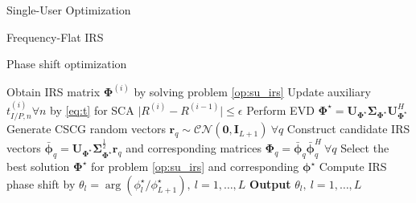 \documentclass{IEEEtran}
\begin{document}
\begin{section}{Single-User Optimization}
\begin{subsection}{Frequency-Flat IRS}
\begin{subsubsection}{Phase shift optimization}
\begin{algorithm}
\begin{algorithmic}[1]
					\State Obtain IRS matrix $\boldsymbol{\Phi}^{(i)}$ by solving problem \ref{op:su_irs}
					\State Update auxiliary $t_{I/P,n}^{(i)} \forall n$ by \ref{eq:t} for SCA
					\Until $\lvert R^{(i)}-R^{(i-1)} \rvert \le \epsilon$
					\State Perform EVD $\boldsymbol{\Phi}^{\star}=\boldsymbol{U}_{\boldsymbol{\Phi}^{\star}}\boldsymbol{\Sigma}_{\boldsymbol{\Phi}^{\star}}\boldsymbol{U}_{\boldsymbol{\Phi}^{\star}}^H$
					\State Generate CSCG random vectors $\boldsymbol{r}_q \sim \mathcal{CN}(\boldsymbol{0},\boldsymbol{I}_{L+1}) \ \forall q$
					\State Construct candidate IRS vectors $\bar{\boldsymbol{\phi}}_q=\boldsymbol{U}_{\boldsymbol{\Phi}^{\star}}\boldsymbol{\Sigma}_{\boldsymbol{\Phi}^{\star}}^{\frac{1}{2}}\boldsymbol{r}_q$ and corresponding matrices $\boldsymbol{\Phi}_q=\bar{\boldsymbol{\phi}}_q\bar{\boldsymbol{\phi}}_q^H  \ \forall q$
					\State Select the best solution $\boldsymbol{\Phi}^\star$ for problem \ref{op:su_irs} and corresponding $\boldsymbol{\phi}^\star$
					\State Compute IRS phase shift by $\theta_l=\arg(\phi_l^\star/\phi_{L+1}^\star), \ l=1,\dots,L$
					\State \textbf{Output} $\theta_l, \ l=1,\dots,L$
				\end{algorithmic}
			\end{algorithm}
		\end{subsubsection}


\end{subsection}
\end{section}
\end{document}
